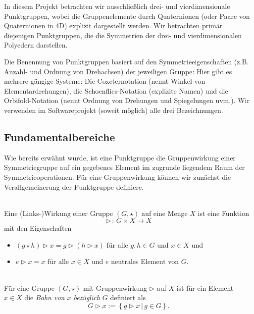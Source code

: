 \noindent In diesem Projekt betrachten wir ausschließlich drei- und vierdimensionale Punktgruppen, wobei die Gruppenelemente
durch Quaternionen (oder Paare von Quaternionen in 4D) explizit dargestellt werden.
Wir betrachten primär diejenigen Punktgruppen, die die Symmetrien der drei- und vierdimensionalen Polyedern darstellen.

\noindent Die Benennung von Punktgruppen basiert auf den Symmetrieeigenschaften (z.B. Anzahl- und Ordnung von Drehachsen) der jeweiligen Gruppe:
Hier gibt es mehrere gängige Systeme: Die Coxeternotation (nennt Winkel von Elementardrehungen), die Schoenflies-Notation (explizite Namen) und die
Orbifold-Notation (nennt Ordnung von Drehungen und Spiegelungen uvm.). Wir verwenden im Softwareprojekt (soweit möglich) alle drei Bezeichnungen.

\subsection{Fundamentalbereiche}\label{fundamentalbereich}

Wie bereits erwähnt wurde, ist eine Punktgruppe die Gruppenwirkung einer Symmetriegruppe auf ein gegebenes Element im zugrunde liegendem Raum der Symmetrieoperationen.
Für eine Gruppenwirkung können wir zunächst die Verallgemeinerung der Punktgruppe definiere.

\begin{definition}[Gruppenwirkung]\label{fundamentalbereich:wirking} \mbox{}\\
 Eine (Links-)Wirkung einer Gruppe $(G, \star)$ auf eine Menge $X$ ist eine Funktion
   $$
      \rhd \, : \, G \times X \longrightarrow X
   $$
   mit den Eigenschaften
   \begin{itemize}
      \item $(g \star h) \rhd x = g \rhd (h \rhd x)$ für alle $g,h \in G$ und $x \in X$ und
      \item $e \rhd x = x$ für alle $x \in X$ und $e$ neutrales Element von $G$.
   \end{itemize}
\end{definition}

\begin{definition}[Orbit] \label{fundamentalbereich:orbit} \mbox{}\\
  Für eine Gruppe $(G, \star)$ mit Gruppenwirkung $\rhd$ auf $X$ ist für ein Element $x \in X$ die \emph{Bahn von $x$ bezüglich $G$} definiert als
   $$
      G \rhd x := \left\{ g \rhd x \, | \, g \in G \right\}.
   $$
\end{definition}

